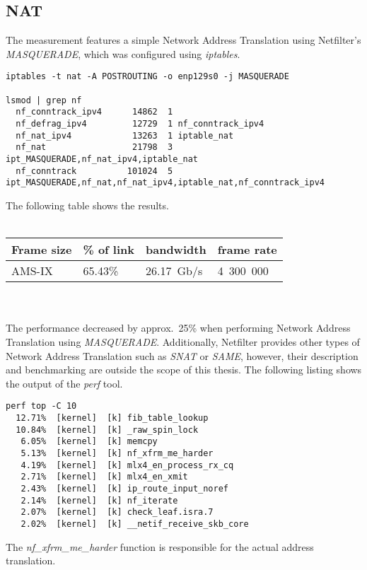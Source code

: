 
\subsection{NAT}
The measurement features a simple Network Address Translation using Netfilter's {\it{MASQUERADE}},
which was configured using {\it{iptables}}.
\begin{lstlisting}
iptables -t nat -A POSTROUTING -o enp129s0 -j MASQUERADE

lsmod | grep nf
  nf_conntrack_ipv4      14862  1 
  nf_defrag_ipv4         12729  1 nf_conntrack_ipv4
  nf_nat_ipv4            13263  1 iptable_nat
  nf_nat                 21798  3 ipt_MASQUERADE,nf_nat_ipv4,iptable_nat
  nf_conntrack          101024  5 ipt_MASQUERADE,nf_nat,nf_nat_ipv4,iptable_nat,nf_conntrack_ipv4
\end{lstlisting}
The following table shows the results.
\\
\\
\begin{tabular}{ | l | l | l | l | }
\hline
Frame size & \% of link & bandwidth & frame rate \\
\hline
AMS-IX & 65.43\% & 26.17~Gb/s & 4~300~000 \\
\hline
\end{tabular}
\\
\\
The performance decreased by approx.~25\% when performing Network Address Translation using {\it{MASQUERADE}}.
Additionally, Netfilter provides other types of Network Address Translation such as {\it{SNAT}} or {\it{SAME}},
however, their description and benchmarking are outside the scope of this thesis.
The following listing shows the output of the {\it{perf}} tool.
\begin{lstlisting}
perf top -C 10
  12.71%  [kernel]  [k] fib_table_lookup
  10.84%  [kernel]  [k] _raw_spin_lock
   6.05%  [kernel]  [k] memcpy
   5.13%  [kernel]  [k] nf_xfrm_me_harder
   4.19%  [kernel]  [k] mlx4_en_process_rx_cq
   2.71%  [kernel]  [k] mlx4_en_xmit
   2.43%  [kernel]  [k] ip_route_input_noref
   2.14%  [kernel]  [k] nf_iterate
   2.07%  [kernel]  [k] check_leaf.isra.7
   2.02%  [kernel]  [k] __netif_receive_skb_core
\end{lstlisting}
The {\it{nf\_xfrm\_me\_harder}} function is responsible for the actual address translation.

